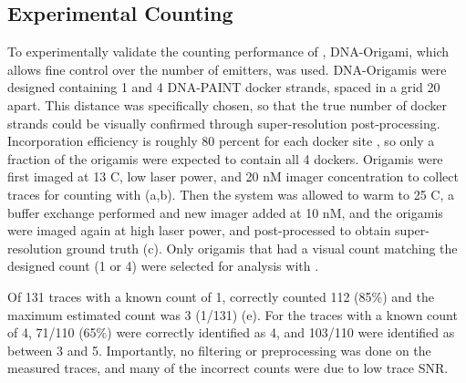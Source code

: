 \subsection{Experimental Counting}
To experimentally validate the counting performance of \ours, DNA-Origami, 
which allows fine control over the number of emitters, was used.
	DNA-Origamis were designed containing 1 and 4 DNA-PAINT docker strands, 
	spaced in a grid 20 \nanometer apart. 
	This distance was specifically chosen, so that the true number of docker strands 
	could be visually confirmed through super-resolution post-processing.
	Incorporation efficiency is roughly 80 percent for each docker site \cite{strauss_2018}, 
	so only a fraction of the origamis were expected to contain all 4 dockers. 
	Origamis were first imaged at 13 C, low laser power, and 20 nM imager concentration to 
	collect traces for counting with \ours (a,b).
	Then the system was allowed to warm to 25 C, a buffer exchange performed and new imager 
	added at 10 nM, and the origamis were imaged again at high laser power,
	and post-processed to obtain super-resolution ground truth (c).
	Only origamis that had a visual count matching the designed count (1 or 4) were selected for analysis with \ours.

Of 131 traces with a known count of 1, \ours correctly counted 112 (85\%) and the maximum 
estimated count was 3 (1/131) (e).
	For the traces with a known count of 4, 71/110 (65\%) were correctly identified as 4, 
	and 103/110 were identified as between 3 and 5.
	Importantly, no filtering or preprocessing was done on the measured traces, and many of 
	the incorrect counts were due to low trace SNR. %
